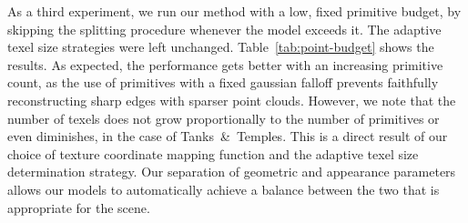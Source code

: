 As a third experiment,
we run our method with a low, fixed primitive budget,
by skipping the splitting procedure whenever the model exceeds it.
The adaptive texel size strategies were left unchanged.
Table~\ref{tab:point-budget} shows the results.
As expected,
the performance gets better with an increasing primitive count,
as the use of primitives with a fixed gaussian falloff prevents faithfully reconstructing sharp edges with sparser point clouds.
However,
we note that the number of texels does not grow proportionally to the number of primitives
or even diminishes, in the case of Tanks~\&~Temples.
This is a direct result of our choice of texture coordinate mapping function and the adaptive texel size determination strategy.
Our separation of geometric and appearance parameters allows our models to automatically achieve a balance between the two that is appropriate for the scene.






